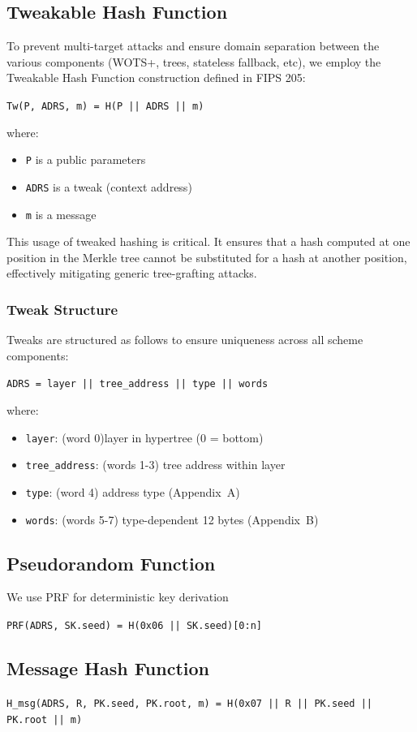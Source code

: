 \subsection{Tweakable Hash Function}

To prevent multi-target attacks and ensure domain separation between the various components 
(WOTS+, trees, stateless fallback, etc), we employ the Tweakable Hash Function construction defined in 
FIPS 205:

\begin{center}
\texttt{Tw(P, ADRS, m) = H(P || ADRS || m)}
\end{center}
where: 
\begin{itemize}
    \item[] \texttt{P} is a public parameters
    \item[] \texttt{ADRS} is a tweak  (context address)
    \item[] \texttt{m} is a message
\end{itemize}

This usage of tweaked hashing is critical. It ensures that a hash computed at one position in the 
Merkle tree cannot be substituted for a hash at another position, effectively mitigating generic 
tree-grafting attacks.

\subsubsection{Tweak Structure}

Tweaks are structured as follows to ensure uniqueness across all scheme components:

\begin{center}
\texttt{ADRS = layer || tree\_address || type || words}
\end{center}
where: 
\begin{itemize}
    \item[] \texttt{layer}: (word 0)layer in hypertree (0 = bottom)
    \item[] \texttt{tree\_address}: (words 1-3) tree address within layer
    \item[] \texttt{type}: (word 4) address type (Appendix~A)
    \item[] \texttt{words}: (words 5-7) type-dependent 12 bytes (Appendix~B)
\end{itemize}

\subsection{Pseudorandom Function}
We use PRF for deterministic key derivation

\texttt{PRF(ADRS, SK.seed) = H(0x06 || SK.seed)[0:n]}

\subsection{Message Hash Function}

\texttt{H\_msg(ADRS, R, PK.seed, PK.root, m) = H(0x07 || R || PK.seed || PK.root || m)}
